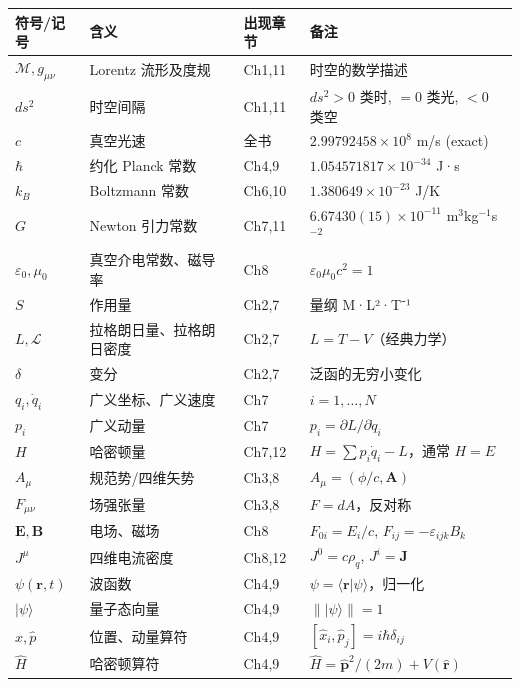\documentclass[11pt,a4paper,openany]{book}
\begin{document}
\begin{center}
\footnotesize
\begin{longtable}{p{2cm}p{4cm}p{2cm}p{5.5cm}}
\toprule
\textbf{符号/记号} & \textbf{含义} & \textbf{出现章节} & \textbf{备注} \\
\midrule
$\mathcal{M}, g_{\mu\nu}$ & Lorentz 流形及度规 & Ch1,11 & 时空的数学描述 \\
$ds^2$ & 时空间隔 & Ch1,11 & $ds^2>0$ 类时, $=0$ 类光, $<0$ 类空 \\
$c$ & 真空光速 & 全书 & $2.99792458\times10^8$ m/s (exact) \\
$\hbar$ & 约化 Planck 常数 & Ch4,9 & $1.054571817\times10^{-34}$ J·s \\
$k_B$ & Boltzmann 常数 & Ch6,10 & $1.380649\times10^{-23}$ J/K \\
$G$ & Newton 引力常数 & Ch7,11 & $6.67430(15)\times10^{-11}$ m$^3$kg$^{-1}$s$^{-2}$ \\
$\varepsilon_0, \mu_0$ & 真空介电常数、磁导率 & Ch8 & $\varepsilon_0\mu_0 c^2 = 1$ \\
$S$ & 作用量 & Ch2,7 & 量纲 M·L²·T⁻¹ \\
$L, \mathcal{L}$ & 拉格朗日量、拉格朗日密度 & Ch2,7 & $L=T-V$（经典力学） \\
$\delta$ & 变分 & Ch2,7 & 泛函的无穷小变化 \\
$q_i, \dot{q}_i$ & 广义坐标、广义速度 & Ch7 & $i=1,\ldots,N$ \\
$p_i$ & 广义动量 & Ch7 & $p_i = \partial L/\partial\dot{q}_i$ \\
$H$ & 哈密顿量 & Ch7,12 & $H=\sum p_i\dot{q}_i-L$，通常 $H=E$ \\
$A_\mu$ & 规范势/四维矢势 & Ch3,8 & $A_\mu=(\phi/c,\mathbf{A})$ \\
$F_{\mu\nu}$ & 场强张量 & Ch3,8 & $F=dA$，反对称 \\
$\mathbf{E}, \mathbf{B}$ & 电场、磁场 & Ch8 & $F_{0i}=E_i/c$, $F_{ij}=-\varepsilon_{ijk}B_k$ \\
$J^\mu$ & 四维电流密度 & Ch8,12 & $J^0=c\rho_q$, $J^i=\mathbf{J}$ \\
$\psi(\mathbf{r},t)$ & 波函数 & Ch4,9 & $\psi=\langle\mathbf{r}|\psi\rangle$，归一化 \\
$|\psi\rangle$ & 量子态向量 & Ch4,9 & $\||\psi\rangle\|=1$ \\
$\hat{x}, \hat{p}$ & 位置、动量算符 & Ch4,9 & $[\hat{x}_i,\hat{p}_j]=i\hbar\delta_{ij}$ \\
$\hat{H}$ & 哈密顿算符 & Ch4,9 & $\hat{H}=\hat{\mathbf{p}}^2/(2m)+V(\hat{\mathbf{r}})$ \\

\end{longtable}
\end{center}
\end{document}
